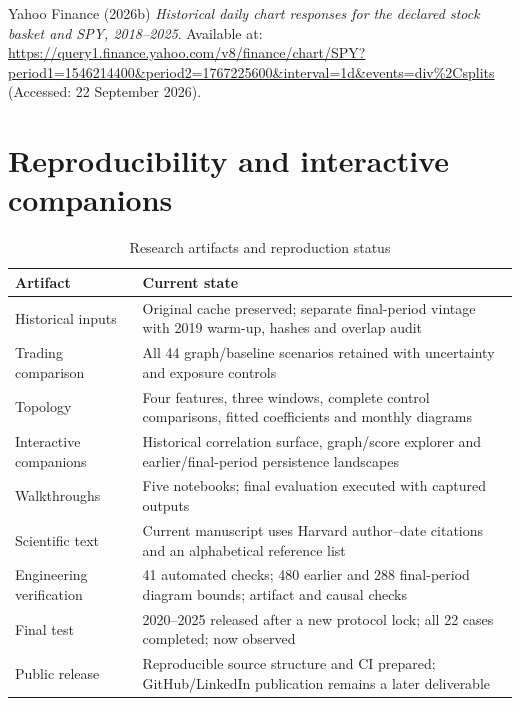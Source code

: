\documentclass[12pt,a4paper,oneside]{article}
\newcommand{\refentry}[1]{\par\begingroup\hangindent=7mm\hangafter=1 #1\par\endgroup\vspace{4pt}}
\begin{document}
\refentry{Yahoo Finance (2026b) \textit{Historical daily chart responses for the declared stock basket and SPY, 2018–2025}. Available at: \url{https://query1.finance.yahoo.com/v8/finance/chart/SPY?period1=1546214400&period2=1767225600&interval=1d&events=div\%2Csplits} (Accessed: 22 September 2026).}
\endgroup
\clearpage\appendix{}

\section{Reproducibility and interactive companions}

\begingroup
\setcounter{table}{26}
\fontsize{10}{12.5}\selectfont
\renewcommand{\arraystretch}{1.12}
\begin{table}[!htbp]
\centering
{}\fontsize{10}{12.5}\selectfont
\begin{tabular}{P{0.290000\dimexpr{}\tabcolsep\relax}P{0.710000\dimexpr{}\tabcolsep\relax}}
\toprule
{} \textbf{Artifact} & \textbf{Current state} \\ \midrule
Historical inputs & Original cache preserved; separate final-period vintage with 2019 warm-up, hashes and overlap audit \\
\midrule[0.2pt]
Trading comparison & All 44 graph/baseline scenarios retained with uncertainty and exposure controls \\
\midrule[0.2pt]
Topology & Four features, three windows, complete control comparisons, fitted coefficients and monthly diagrams \\
\midrule[0.2pt]
Interactive companions & Historical correlation surface, graph/score explorer and earlier/final-period persistence landscapes \\
\midrule[0.2pt]
Walkthroughs & Five notebooks; final evaluation executed with captured outputs \\
\midrule[0.2pt]
Scientific text & Current manuscript uses Harvard author–date citations and an alphabetical reference list \\
\midrule[0.2pt]
Engineering verification & 41 automated checks; 480 earlier and 288 final-period diagram bounds; artifact and causal checks \\
\midrule[0.2pt]
Final test & 2020–2025 released after a new protocol lock; all 22 cases completed; now observed \\
\midrule[0.2pt]
Public release & Reproducible source structure and CI prepared; GitHub/LinkedIn publication remains a later deliverable \\
\bottomrule
\end{tabular}
\caption{Research artifacts and reproduction status}\label{tab:27}
\end{table}
\endgroup
\end{document}
